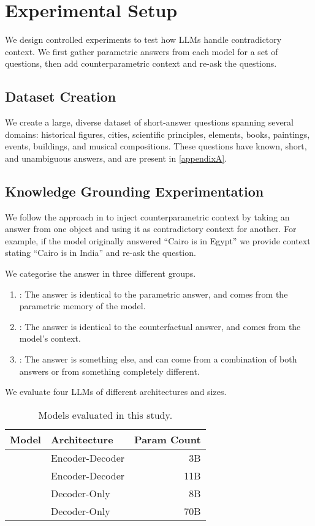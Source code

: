 \section{Experimental Setup}

We design controlled experiments to test how LLMs handle contradictory context.
We first gather parametric answers from each model for a set of questions, then add counterparametric context and re-ask the questions.

\subsection{Dataset Creation}
We create a large, diverse dataset of short-answer questions spanning several domains: historical figures, cities, scientific principles, elements, books, paintings, events, buildings, and musical compositions.
These questions have known, short, and unambiguous answers, and are present in \cref{appendixA}.

\subsection{Knowledge Grounding Experimentation}
We follow the approach in \citet{factual_recall} to inject counterparametric context by taking an answer from one object and using it as contradictory context for another.
For example, if the model originally answered ``Cairo is in Egypt'' we provide context stating ``Cairo is in India'' and re-ask the question.

We categorise the answer in three different groups.
\begin{enumerate}
	\item \Parametric{}: The answer is identical to the parametric answer, and comes from the parametric memory of the model.
	\item \Contextual{}: The answer is identical to the counterfactual answer, and comes from the model's context.
	\item \Other{}: The answer is something else, and can come from a combination of both answers or from something completely different.
\end{enumerate}

We evaluate four LLMs of different architectures and sizes.

\begin{table}[t]
	\centering
	\footnotesize
	\renewcommand{\arraystretch}{1.2}
	\begin{tabular}{l l r}
		\toprule
			Model             & Architecture    & Param Count \\
		\midrule
			\smallflan{}      & Encoder-Decoder & 3B          \\
			\bigflan{}        & Encoder-Decoder & 11B         \\[8pt]
			\llamaparbox{}    & Decoder-Only    & 8B          \\[8pt]
			\bigllamaparbox{} & Decoder-Only    & 70B         \\[8pt]
		\bottomrule
	\end{tabular}
	\caption{Models evaluated in this study.}
	\label{models}
\end{table}

